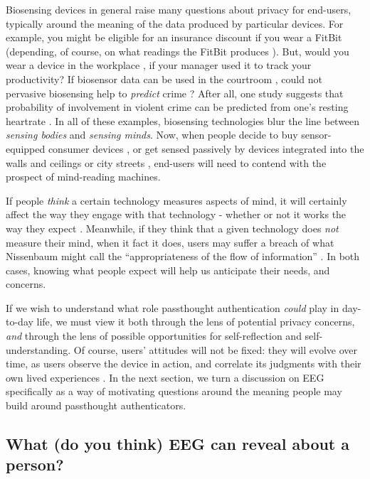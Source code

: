 \documentclass[sigconf]{acmart}
\begin{document}
Biosensing devices in general raise many questions about privacy for end-users,
typically around the meaning of the data produced by particular devices.
For example, you might be eligible for an insurance discount if you wear a FitBit \cite{Bernard2015} (depending, of course, on what readings the FitBit produces \cite{Brain2015}). 
But, would you wear a device in the workplace \cite{solon2015}, if your manager used it to track your productivity?
If biosensor data can be used in the courtroom \cite{Crawford2014}, could not pervasive biosensing help to \emph{predict} crime \cite{Thompson2011}? 
After all, one study suggests that probability of involvement in violent crime can be predicted from one's resting heartrate \cite{Latvala2015}. 
In all of these examples, biosensing technologies blur the line between \emph{sensing bodies} and \emph{sensing minds}. 
Now, when people decide to buy sensor-equipped consumer devices \cite{Stables2016}, or get sensed passively by devices integrated into the walls and ceilings \cite{Adib2015} or city streets \cite{Thrift2014}, end-users will need to contend with the prospect of mind-reading machines.

If people \emph{think} a certain technology measures aspects of mind, it will certainly affect the way they engage with that technology - whether or not it works the way they expect \cite{Ali2014a}. Meanwhile, if they think that a given technology does \emph{not} measure their mind, when it fact it does, users may suffer a breach of what Nissenbaum might call the ``appropriateness of the flow of information'' \cite{Doyle2011}. In both cases, knowing what people expect will help us anticipate their needs, and concerns.

If we wish to understand what role passthought authentication \emph{could} play in day-to-day life,
we must view it both through the lens of potential privacy concerns, \emph{and} through the lens of possible opportunities for self-reflection and self-understanding. 
Of course, users' attitudes will not be fixed: they will evolve over time, as users observe the device in action, and correlate its judgments with their own lived experiences \cite{Nafus2016}.
In the next section, we turn a discussion on EEG specifically as a way of motivating questions around the meaning people may build around passthought authenticators.


\subsection{What (do you think) EEG can reveal about a person?}
\label{sec:orgb912760}
\end{document}
